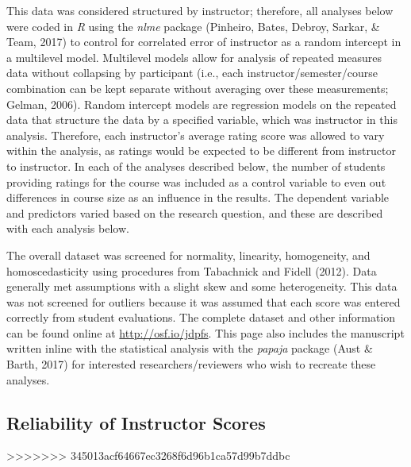 \documentclass[man]{apa6}
\theoremstyle{definition}
\theoremstyle{definition}
\theoremstyle{definition}
\theoremstyle{remark}
\begin{document}
This data was considered structured by instructor; therefore, all analyses below were coded in \emph{R} using the \emph{nlme} package (Pinheiro, Bates, Debroy, Sarkar, \& Team, 2017) to control for correlated error of instructor as a random intercept in a multilevel model. Multilevel models allow for analysis of repeated measures data without collapsing by participant (i.e., each instructor/semester/course combination can be kept separate without averaging over these measurements; Gelman, 2006). Random intercept models are regression models on the repeated data that structure the data by a specified variable, which was instructor in this analysis. Therefore, each instructor's average rating score was allowed to vary within the analysis, as ratings would be expected to be different from instructor to instructor. In each of the analyses described below, the number of students providing ratings for the course was included as a control variable to even out differences in course size as an influence in the results. The dependent variable and predictors varied based on the research question, and these are described with each analysis below.

The overall dataset was screened for normality, linearity, homogeneity, and homoscedasticity using procedures from Tabachnick and Fidell (2012). Data generally met assumptions with a slight skew and some heterogeneity. This data was not screened for outliers because it was assumed that each score was entered correctly from student evaluations. The complete dataset and other information can be found online at \url{http://osf.io/jdpfs}. This page also includes the manuscript written inline with the statistical analysis with the \emph{papaja} package (Aust \& Barth, 2017) for interested researchers/reviewers who wish to recreate these analyses.

\hypertarget{reliability-of-instructor-scores}{%
\subsection{Reliability of Instructor Scores}\label{reliability-of-instructor-scores}}
>>>>>>> 345013acf64667ec3268f6d96b1ca57d99b7ddbc
\end{document}
